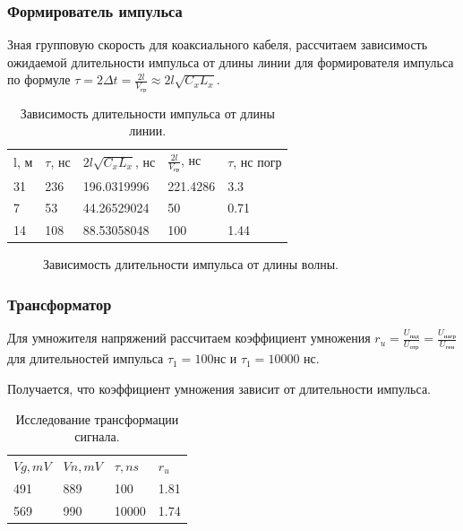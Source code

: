 \documentclass[12pt]{article}
\begin{document}
\begin{flushleft}
\subsubsection{Формирователь импульса}
Зная групповую скорость для коаксиального кабеля, рассчитаем зависимость ожидаемой длительности импульса от длины линии для формирователя импульса по формуле $\tau = 2\Delta t = \frac{2l}{V_{\text{гр}}} \approx 2l\sqrt{C_xL_x}$.
\begin{table}[!h]
\caption{Зависимость длительности импульса от длины линии.}
\begin{tabular}{lllll}
l, м & $\tau$, нс & $2l\sqrt{C_xL_x} $, нс & $\frac{2l}{V_{\text{гр}}}$, нс & $\tau$, нс погр \\
31  & 236  & 196.0319996       & 221.4286  & 3.3     \\
7   & 53   & 44.26529024       & 50        & 0.71    \\
14  & 108  & 88.53058048       & 100       & 1.44   
\end{tabular}
\end{table}
\begin{figure}[!h]
\caption{Зависимость длительности импульса от длины волны.}
\label{ris:image}
\end{figure}
\newpage
\subsubsection{Трансформатор}
Для умножителя напряжений рассчитаем коэффициент умножения $r_u = \frac{U_{\text{пад}}}{U_{\text{отр}}} = \frac{U_{\text{нагр}}}{U_{\text{ген}}}$ для длительностей импульса $\tau_1 = 100$нс и $\tau_1 = 10000$ нс.

Получается, что коэффициент умножения зависит от длительности импульса.
\begin{table}[!h]
\caption{Исследование трансформации сигнала.}
\begin{tabular}{llll}
$Vg,mV$ & $Vn,mV$ & $\tau,ns$  & $r_u$  \\
491   & 889   & 100   & 1.81 \\
569   & 990   & 10000 & 1.74
\end{tabular}
\end{table}

\end{flushleft}
\end{document}
